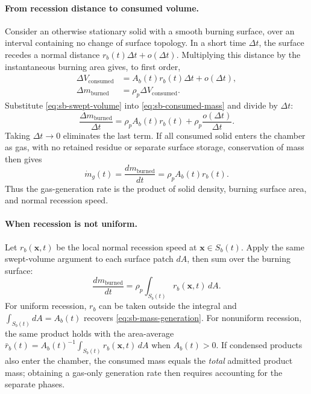 \paragraph{From recession distance to consumed volume.}
Consider an otherwise stationary solid with a smooth burning surface,
over an interval containing no change of surface topology. In a short
time $\Delta t$, the surface recedes a normal distance
$r_b(t)\Delta t+o(\Delta t)$. Multiplying this distance by the
instantaneous burning area gives, to first order,
\begin{align}
 \Delta V_{\mathrm{consumed}}
 &=A_b(t)r_b(t)\Delta t+o(\Delta t),
 \label{eq:sb-swept-volume}\\
 \Delta m_{\mathrm{burned}}
 &=\rho_p\Delta V_{\mathrm{consumed}}.
 \label{eq:sb-consumed-mass}
\end{align}
Substitute \eqref{eq:sb-swept-volume} into
\eqref{eq:sb-consumed-mass} and divide by $\Delta t$:
\[
 \frac{\Delta m_{\mathrm{burned}}}{\Delta t}
 =\rho_p A_b(t)r_b(t)
   +\rho_p\frac{o(\Delta t)}{\Delta t}.
\]
Taking $\Delta t\to0$ eliminates the last term. If all consumed solid
enters the chamber as gas, with no retained residue or separate surface
storage, conservation of mass then gives
\begin{equation}\label{eq:sb-mass-generation}
 \dot m_g(t)
 =\frac{dm_{\mathrm{burned}}}{dt}
 =\rho_p A_b(t)r_b(t).
\end{equation}
Thus the gas-generation rate is the product of solid density, burning
surface area, and normal recession speed.

\paragraph{When recession is not uniform.}
Let $r_b(\mathbf x,t)$ be the local normal recession speed at
$\mathbf x\in S_b(t)$. Apply the same swept-volume argument to each
surface patch $dA$, then sum over the burning surface:
\begin{equation}\label{eq:sb-surface-mass}
 \frac{dm_{\mathrm{burned}}}{dt}
 =\rho_p\int_{S_b(t)}r_b(\mathbf x,t)\,dA.
\end{equation}
For uniform recession, $r_b$ can be taken outside the integral and
$\int_{S_b(t)}dA=A_b(t)$ recovers
\eqref{eq:sb-mass-generation}. For nonuniform recession, the same product
holds with the area-average
$\bar r_b(t)=A_b(t)^{-1}\int_{S_b(t)}r_b(\mathbf x,t)\,dA$ when $A_b(t)>0$.
If condensed products also enter the chamber, the consumed mass equals
the \emph{total} admitted product mass; obtaining a gas-only generation
rate then requires accounting for the separate phases.

